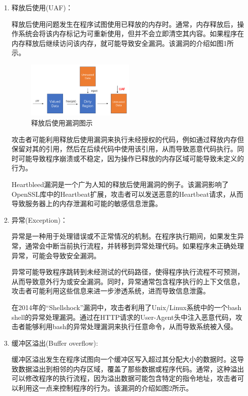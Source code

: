 \begin{enumerate}
	\item 释放后使用(UAF)：
	
	释放后使用问题发生在程序试图使用已释放的内存时。通常，内存释放后，操作系统会将该内存标记为可重新使用，但并不会立即清空其内容。如果程序在内存释放后继续访问该内存，就可能导致安全漏洞。该漏洞的介绍如图1所示。
	\begin{figure}[htbp]
		\centering
		\includegraphics[width=0.5\textwidth]{pictures/UAF.png}
		\caption{释放后使用漏洞图示}
		\label{fig:UAF}
	\end{figure}
	攻击者可能利用释放后使用漏洞来执行未经授权的代码，例如通过释放内存但保留对其的引用，然后在后续代码中使用该引用，从而导致恶意代码执行。同时可能导致程序崩溃或不稳定，因为操作已释放的内存区域可能导致未定义的行为。
	
	Heartbleed漏洞是一个广为人知的释放后使用漏洞的例子。该漏洞影响了OpenSSL库中的Heartbeat扩展，攻击者可以发送恶意的Heartbeat请求，从而导致服务器上的内存泄漏和可能的敏感信息泄露。
	
	\item 异常(Exception)：
	
	异常是一种用于处理错误或不正常情况的机制。在程序执行期间，如果发生异常，通常会中断当前执行流程，并转移到异常处理代码。如果程序未正确处理异常，可能会导致安全漏洞。
	
	异常可能导致程序跳转到未经测试的代码路径，使得程序执行流程不可预测，从而导致意外行为或安全漏洞。同时，异常通常包含程序执行的上下文信息，攻击者可能利用这些信息来进一步渗透系统，进而导致信息泄露。
	
	在2014年的``Shellshock''漏洞中，攻击者利用了Unix/Linux系统中的一个bash
	shell的异常处理漏洞。通过在HTTP请求的User-Agent头中注入恶意代码，攻击者能够利用bash的异常处理漏洞来执行任意命令，从而导致系统被入侵。
	
	\item 缓冲区溢出(Buffer overflow):
	
	缓冲区溢出发生在程序试图向一个缓冲区写入超过其分配大小的数据时。这导致数据溢出到相邻的内存区域，覆盖了那些数据或程序代码。通常，这种溢出可以修改程序的执行流程，因为溢出数据可能包含特定的指令地址，攻击者可以利用这一点来控制程序的行为。该漏洞的介绍如图2所示。
	

\end{enumerate}
